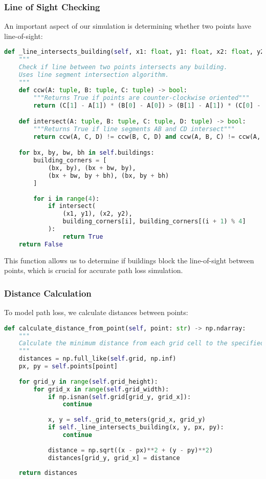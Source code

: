 \newpage
\subsubsection{Line of Sight Checking}

An important aspect of our simulation is determining whether two points have line-of-sight:

\begin{lstlisting}[language=python, caption={Line of Sight Checking}]
def _line_intersects_building(self, x1: float, y1: float, x2: float, y2: float) -> bool:
    """
    Check if line between two points intersects any building.
    Uses line segment intersection algorithm.
    """
    def ccw(A: tuple, B: tuple, C: tuple) -> bool:
        """Returns True if points are counter-clockwise oriented"""
        return (C[1] - A[1]) * (B[0] - A[0]) > (B[1] - A[1]) * (C[0] - A[0])

    def intersect(A: tuple, B: tuple, C: tuple, D: tuple) -> bool:
        """Returns True if line segments AB and CD intersect"""
        return ccw(A, C, D) != ccw(B, C, D) and ccw(A, B, C) != ccw(A, B, D)

    for bx, by, bw, bh in self.buildings:
        building_corners = [
            (bx, by), (bx + bw, by),
            (bx + bw, by + bh), (bx, by + bh)
        ]
        
        for i in range(4):
            if intersect(
                (x1, y1), (x2, y2),
                building_corners[i], building_corners[(i + 1) % 4]
            ):
                return True
    return False
\end{lstlisting}

This function allows us to determine if buildings block the line-of-sight between points, which is crucial for accurate path loss simulation.

\subsubsection{Distance Calculation}

To model path loss, we calculate distances between points:

\begin{lstlisting}[language=python, caption={Distance Calculation}]
def calculate_distance_from_point(self, point: str) -> np.ndarray:
    """
    Calculate the minimum distance from each grid cell to the specified point.
    """
    distances = np.full_like(self.grid, np.inf)
    px, py = self.points[point]
    
    for grid_y in range(self.grid_height):
        for grid_x in range(self.grid_width):
            if np.isnan(self.grid[grid_y, grid_x]):
                continue
                
            x, y = self._grid_to_meters(grid_x, grid_y)
            if self._line_intersects_building(x, y, px, py):
                continue
                
            distance = np.sqrt((x - px)**2 + (y - py)**2)
            distances[grid_y, grid_x] = distance
            
    return distances
\end{lstlisting}

